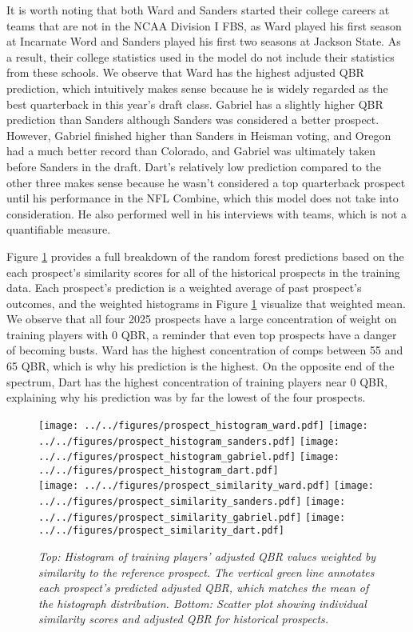 \documentclass[Review, sageh, times]{sagej}
\begin{document}
It is worth noting that both Ward and Sanders started their college careers at teams that are not in the NCAA Division I FBS, as Ward played his first season at Incarnate Word and Sanders played his first two seasons at Jackson State. As a result, their college statistics used in the model do not include their statistics from these schools. We observe that Ward has the highest adjusted QBR prediction, which intuitively makes sense because he is widely regarded as the best quarterback in this year's draft class. Gabriel has a slightly higher QBR prediction than Sanders although Sanders was considered a better prospect. However, Gabriel finished higher than Sanders in Heisman voting, and Oregon had a much better record than Colorado, and Gabriel was ultimately taken before Sanders in the draft. Dart's relatively low prediction compared to the other three makes sense because he wasn't considered a top quarterback prospect until his performance in the NFL Combine, which this model does not take into consideration. He also performed well in his interviews with teams, which is not a quantifiable measure.

Figure \ref{fig:prospect-plots} provides a full breakdown of the random forest predictions based on the each prospect's similarity scores for all of the historical prospects in the training data. Each prospect's prediction is a weighted average of past prospect's outcomes, and the weighted histograms in Figure \ref{fig:prospect-plots} visualize that weighted mean. We observe that all four 2025 prospects have a large concentration of weight on training players with 0 QBR, a reminder that even top prospects have a danger of becoming busts. Ward has the highest concentration of comps between 55 and 65 QBR, which is why his prediction is the highest. On the opposite end of the spectrum, Dart has the highest concentration of training players near 0 QBR, explaining why his prediction was by far the lowest of the four prospects.

\begin{figure}[H]
    \centering
    \texttt{[image: ../../figures/prospect\_histogram\_ward.pdf]}
    \texttt{[image: ../../figures/prospect\_histogram\_sanders.pdf]}
    \texttt{[image: ../../figures/prospect\_histogram\_gabriel.pdf]}
    \texttt{[image: ../../figures/prospect\_histogram\_dart.pdf]} \\
    \texttt{[image: ../../figures/prospect\_similarity\_ward.pdf]}
    \texttt{[image: ../../figures/prospect\_similarity\_sanders.pdf]}
    \texttt{[image: ../../figures/prospect\_similarity\_gabriel.pdf]}
    \texttt{[image: ../../figures/prospect\_similarity\_dart.pdf]}
    \caption{\textit{Top: Histogram of training players' adjusted QBR values weighted by similarity to the reference prospect. The vertical green line annotates each prospect's predicted adjusted QBR, which matches the mean of the histograph distribution. Bottom: Scatter plot showing individual similarity scores and adjusted QBR for historical prospects.}}
    \label{fig:prospect-plots}
\end{figure}
\end{document}
